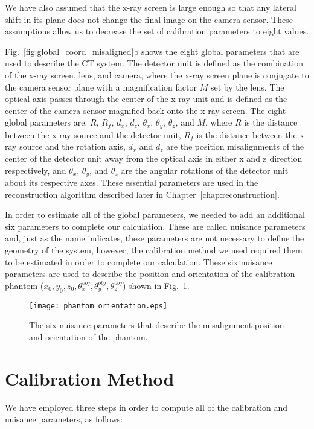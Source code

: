 We have also assumed that the x-ray screen is large enough so that any lateral shift in its plane does not change the final image on the camera sensor.  These assumptions allow us to decrease the set of calibration parameters to eight values.

Fig.~\ref{fig:global_coord_misaligned}b shows the eight global parameters that are used to describe the CT system.  The detector unit is defined as the combination of the x-ray screen, lens, and camera, where the x-ray screen plane is conjugate to the camera sensor plane with a magnification factor $M$ set by the lens.  The optical axis passes through the center of the x-ray unit and is defined as the center of the camera sensor magnified back onto the x-ray screen.  The eight global parameters are: $R$, $R_f$, $d_x$, $d_z$, $\theta_x$, $\theta_y$, $\theta_z$, and $M$, where $R$ is the distance between the x-ray source and the detector unit, $R_f$ is the distance between the x-ray source and the rotation axis, $d_x$ and $d_z$ are the position misalignments of the center of the detector unit away from the optical axis in either x and z direction respectively, and $\theta_x$, $\theta_y$, and $\theta_z$ are the angular rotations of the detector unit about its respective axes.  These essential parameters are used in the reconstruction algorithm described later in Chapter~\ref{chap:reconstruction}.

In order to estimate all of the global parameters, we needed to add an additional six parameters to complete our calculation.  These are called nuisance parameters and, just as the name indicates, these parameters are not necessary to define the geometry of the system, however, the calibration method we used required them to be estimated in order to complete our calculation.  These six nuisance parameters are used to describe the position and orientation of the calibration phantom ($x_0, y_0, z_0, \theta^{obj}_x, \theta_y^{obj}, \theta_z^{obj}$) shown in Fig.~\ref{fig:phantom_orientation}.  

\begin{figure}[ht]
\centering
\texttt{[image: phantom\_orientation.eps]}
\caption{The six nuisance parameters that describe the misalignment position and orientation of the phantom.}
\label{fig:phantom_orientation}
\end{figure}

\section{Calibration Method}
\label{section:calibration_method}
We have employed three steps in order to compute all of the calibration and nuisance parameters, as follows:

